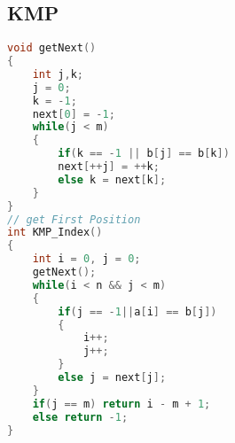 ﻿\subsection{KMP}
\begin{lstlisting}[language=C++]
void getNext()
{    
	int j,k;
    j = 0;
    k = -1;
    next[0] = -1;    
	while(j < m)
    {        
		if(k == -1 || b[j] == b[k])
        next[++j] = ++k;        
		else k = next[k];
    }    
}  
// get First Position
int KMP_Index()
{    
	int i = 0, j = 0;
    getNext();    
    while(i < n && j < m)
    {        
		if(j == -1||a[i] == b[j])
        {
            i++;
            j++;
        }    
        else j = next[j];        
    }    
    if(j == m) return i - m + 1;    
	else return -1;
} 	
	\end{lstlisting}